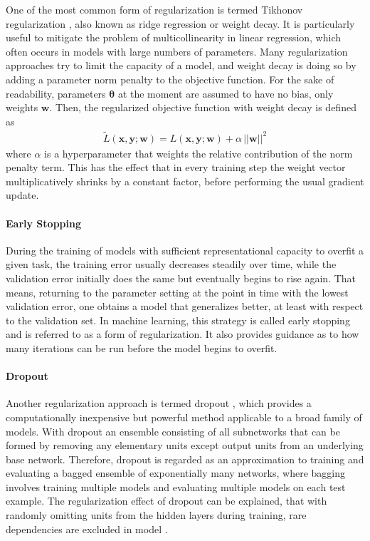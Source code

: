 \documentclass{scrartcl}
\begin{document}
One of the most common  form of regularization is termed Tikhonov regularization \cite{Tikhonov1943}, also known as ridge regression or weight decay. It is particularly useful to mitigate the problem of multicollinearity in linear regression, which often occurs in models with large numbers of parameters. Many regularization approaches try to limit the capacity of a model, and weight decay is doing so by adding a parameter norm penalty to the objective function. For the sake of readability, parameters  $\boldsymbol \theta$ at the moment are assumed to have no bias, only weights $\mathbf w$. Then, the regularized objective function with weight decay is defined as
\begin{align}
\tilde L(\mathbf x, \mathbf y; \mathbf w) = L(\mathbf x, \mathbf y; \mathbf w) + \alpha \,||\mathbf w||^2
\end{align} 
where $\alpha$ is a hyperparameter that weights the relative contribution of the norm penalty term. This has the effect that in every training step the weight vector multiplicatively shrinks by a constant factor, before performing the usual gradient update. 


\paragraph{Early Stopping} 

During the training of models with sufficient representational capacity to overfit a given task, the training error usually decreases steadily over time, while the validation error initially does the same but eventually begins to rise again. That means, returning to the parameter setting at the point in time with the lowest validation error, one obtains a model that generalizes better, at least with respect to the validation set. In machine learning, this strategy is called early stopping and is referred to as a form of regularization. It also provides guidance as to how many iterations can be run before the model begins to overfit. 



\paragraph{Dropout} Another regularization approach is termed dropout \cite{Srivastava2014}, which provides a computationally inexpensive but powerful method applicable to a broad family of models. With dropout an ensemble consisting of all subnetworks that can be formed by removing any elementary units except output units from an underlying base network. Therefore, dropout is regarded as an approximation to training and evaluating a bagged ensemble of exponentially many networks, where bagging involves training multiple models and evaluating multiple models on each test example. The regularization effect of dropout can be explained, that with randomly omitting units from the hidden layers during training, rare dependencies are excluded in model \cite{Dahl2013}.
\end{document}
